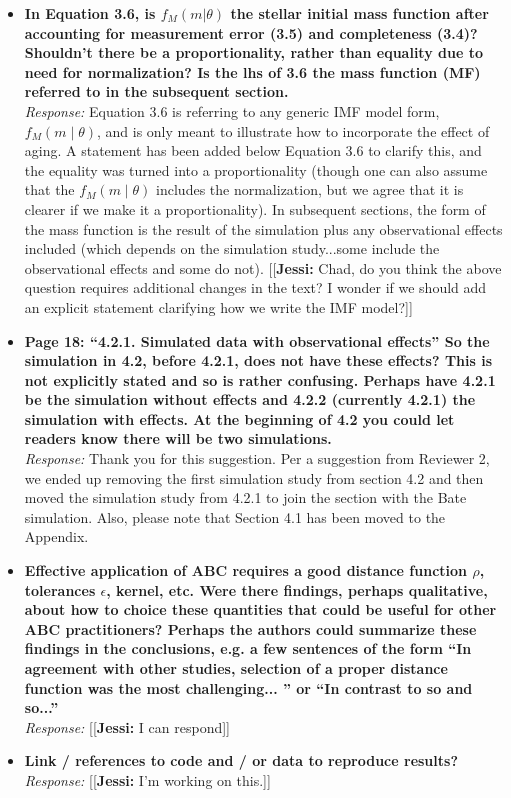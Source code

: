 \documentclass[11pt, oneside]{article}   	%
\newcommand{\jessi}[1]{{\color{blue}[[\textbf{Jessi: }#1]]}}
\begin{document}
\begin{itemize}
\item {\bf In Equation 3.6, is $f_M (m|\theta)$ the stellar initial mass function after accounting for measurement error (3.5) and completeness (3.4)? Shouldn't there be a proportionality, rather than equality due to need for normalization? Is the lhs of 3.6 the mass function (MF) referred to in the subsequent section.} \\
\noindent \emph{Response:}  Equation 3.6 is referring to any generic IMF model form, $f_M(m \mid \theta)$, and is only meant to illustrate how to incorporate the effect of aging.  A statement has been added below Equation 3.6 to clarify this, and the equality was turned into a proportionality (though one can also assume that the $f_M(m \mid \theta)$ includes the normalization, but we agree that it is clearer if we make it a proportionality).  In subsequent sections, the form of the mass function is the result of the simulation plus any observational effects included (which depends on the simulation study...some include the observational effects and some do not).  
\jessi{Chad, do you think the above question requires additional changes in the text?  I wonder if we should add an explicit statement clarifying how we write the IMF model?}
\bigskip

\item {\bf Page 18: ``4.2.1. Simulated data with observational effects'' So the simulation in 4.2, before 4.2.1, does not have these effects? This is not explicitly stated and so is rather confusing. Perhaps have 4.2.1 be the simulation without effects and 4.2.2 (currently 4.2.1) the simulation with effects. At the beginning of 4.2 you could let readers know there will be two simulations. }\\
\noindent \emph{Response:} Thank you for this suggestion.  Per a suggestion from Reviewer 2, we ended up removing the first simulation study from section 4.2 and then moved the simulation study from 4.2.1 to join the section with the Bate simulation.  Also, please note that Section 4.1 has been moved to the Appendix.
\bigskip

\item {\bf Effective application of ABC requires a good distance function $\rho$, tolerances $\epsilon$, kernel, etc. Were there findings, perhaps qualitative, about how to choice these quantities that could be useful for other ABC practitioners? Perhaps the authors could summarize these findings in the conclusions, e.g. a few sentences of the form ``In agreement with other studies, selection of a proper distance function was the most challenging... '' or ``In contrast to so and so...'' }\\
\noindent \emph{Response:} \jessi{I can respond}
\bigskip

\item {\bf Link / references to code and / or data to reproduce results?} \\
\noindent \emph{Response:} \jessi{I'm working on this.}
\bigskip
\end{itemize}
\end{document}

